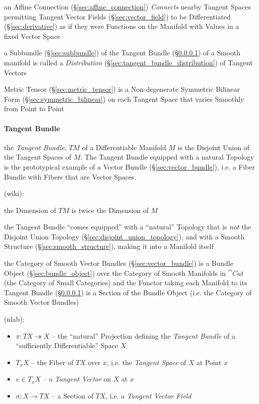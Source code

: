 \fist an Affine Connection (\S\ref{sec:affine_connection}) \emph{Connects}
nearby Tangent Spaces permitting Tangent Vector Fields
(\S\ref{sec:vector_field}) to be Differentiated (\S\ref{sec:derivative}) as if
they were Functions on the Manifold with Values in a fixed Vector Space

a Subbundle (\S\ref{sec:subbundle}) of the Tangent Bundle
(\S\ref{sec:tangent_bundle}) of a Smooth manifold is called a
\emph{Distribution} (\S\ref{sec:tangent_bundle_distribution}) of Tangent
Vectors

Metric Tensor (\S\ref{sec:metric_tensor}) is a Non-degenerate Symmetric Bilinear
Form (\S\ref{sec:symmetric_bilinear}) on each Tangent Space that varies Smoothly
from Point to Point



\paragraph{Tangent Bundle}\label{sec:tangent_bundle}\hfill

the \emph{Tangent Bundle}, $T M$ of a Differentiable Manifold $M$ is the
Disjoint Union of the Tangent Spaces of $M$. The Tangent Bundle equipped with a
natural Topology is the prototypical example of a Vector Bundle
(\S\ref{sec:vector_bundle}), i.e. a Fiber Bundle with Fibers that are Vector
Spaces.

(wiki):

the Dimension of $T M$ is twice the Dimension of $M$

the Tangent Bundle ``comes equipped'' with a ``natural'' Topology that is
\emph{not} the Disjoint Union Topology (\S\ref{sec:disjoint_union_topology}),
and with a Smooth Structure (\S\ref{sec:smooth_structure}), making it into a
Manifold itself

the Category of Smooth Vector Bundles (\S\ref{sec:vector_bundle}) is a Bundle
Object (\S\ref{sec:bundle_object}) over the Category of Smooth Manifolds in
$\cat{Cat}$ (the Category of Small Categories) and the Functor taking each
Manifold to its Tangent Bundle (\S\ref{sec:tangent_bundle}) is a Section of the
Bundle Object (i.e. the Category of Smooth Vector Bundles)

(nlab):

\begin{itemize}
  \item $\pi : T X \twoheadrightarrow X$ -- the ``natural'' Projection defining
    the \emph{Tangent Bundle} of a ``sufficiently Differentiable'' Space $X$
  \item $T_x X$ -- the Fiber of $T X$ over $x$, i.e. the \emph{Tangent Space} of
    $X$ at Point $x$
  \item $v \in T_x X$ -- a \emph{Tangent Vector} on $X$ at $x$
  \item $\sigma : X \rightarrow T X$ -- a Section of $T X$, i.e. a
    \emph{Tangent Vector Field}
\end{itemize}

